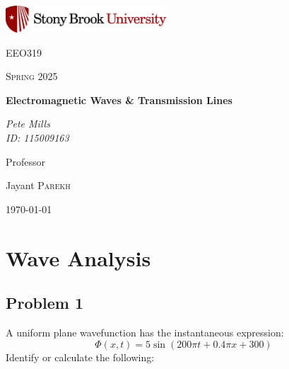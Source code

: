 \documentclass{article}
\begin{document}
	
\begin{titlepage}
	\centering
	\includegraphics[width=0.45\textwidth]{sbu}\par\vspace{1cm}
	{\LARGE \textsc{EEO319}\par}
	\vspace{1cm}
	{\Large \textsc{Spring 2025}\par}
	\vspace{1.5cm}
	{\huge\bfseries Electromagnetic Waves \& Transmission Lines\par}
	\vspace{2cm}
	{\Large\itshape Pete Mills\\ID: 115009163\par}
	\vfill
	Professor\par
	Jayant \textsc{Parekh}

	\vfill

	{\large \today\par}
\end{titlepage}

	\newcommand{\assName}{020925 Homework 2 (1).pdf}

	
	
	

\section{Wave Analysis}

\subsection{Problem 1}
A uniform plane wavefunction has the instantaneous expression:
\begin{equation}
    \Phi(x,t) = 5 \sin(200\pi t + 0.4\pi x + 300)
\end{equation}
Identify or calculate the following:
\end{document}
